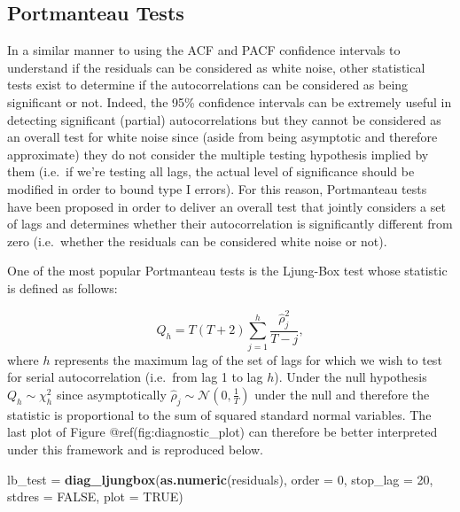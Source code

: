 \documentclass[]{book}
\newenvironment{Shaded}{\begin{snugshade}}{\end{snugshade}}
\newcommand{\DataTypeTok}[1]{\textcolor[rgb]{0.13,0.29,0.53}{#1}}
\newcommand{\DecValTok}[1]{\textcolor[rgb]{0.00,0.00,0.81}{#1}}
\newcommand{\KeywordTok}[1]{\textcolor[rgb]{0.13,0.29,0.53}{\textbf{#1}}}
\newcommand{\NormalTok}[1]{#1}
\newcommand{\OtherTok}[1]{\textcolor[rgb]{0.56,0.35,0.01}{#1}}
\newcommand{\StringTok}[1]{\textcolor[rgb]{0.31,0.60,0.02}{#1}}
\theoremstyle{definition}
\theoremstyle{definition}
\theoremstyle{definition}
\theoremstyle{remark}
\begin{document}
\hypertarget{portmanteau-tests}{%
\subsection{Portmanteau Tests}\label{portmanteau-tests}}

In a similar manner to using the ACF and PACF confidence intervals to
understand if the residuals can be considered as white noise, other
statistical tests exist to determine if the autocorrelations can be
considered as being significant or not. Indeed, the 95\% confidence
intervals can be extremely useful in detecting significant (partial)
autocorrelations but they cannot be considered as an overall test for
white noise since (aside from being asymptotic and therefore
approximate) they do not consider the multiple testing hypothesis
implied by them (i.e.~if we're testing all lags, the actual level of
significance should be modified in order to bound type I errors). For
this reason, Portmanteau tests have been proposed in order to deliver an
overall test that jointly considers a set of lags and determines whether
their autocorrelation is significantly different from zero (i.e.~whether
the residuals can be considered white noise or not).

One of the most popular Portmanteau tests is the Ljung-Box test whose
statistic is defined as follows:

\[Q_h = T(T+2) \sum_{j=1}^{h} \frac{\hat{\rho}_j^2}{T - j},\] where
\(h\) represents the maximum lag of the set of lags for which we wish to
test for serial autocorrelation (i.e.~from lag 1 to lag \(h\)). Under
the null hypothesis \(Q_h \sim \chi_h^2\) since asymptotically
\(\hat{\rho}_j \sim \mathcal{N}\left(0, \frac{1}{T}\right)\) under the
null and therefore the statistic is proportional to the sum of squared
standard normal variables. The last plot of Figure
@ref(fig:diagnostic\_plot) can therefore be better interpreted under
this framework and is reproduced below.

\begin{Shaded}
\begin{Highlighting}[]
\NormalTok{lb_test =}\StringTok{ }\KeywordTok{diag_ljungbox}\NormalTok{(}\KeywordTok{as.numeric}\NormalTok{(residuals), }\DataTypeTok{order =} \DecValTok{0}\NormalTok{, }\DataTypeTok{stop_lag =} \DecValTok{20}\NormalTok{, }\DataTypeTok{stdres =} \OtherTok{FALSE}\NormalTok{, }\DataTypeTok{plot =} \OtherTok{TRUE}\NormalTok{)}
\end{Highlighting}
\end{Shaded}
\end{document}
